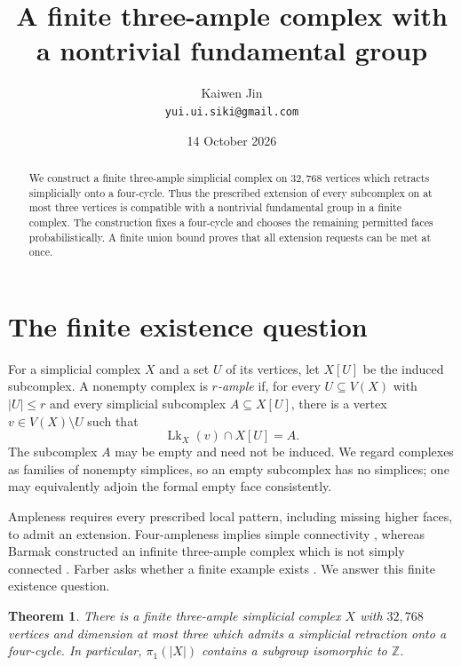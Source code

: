 \documentclass[11pt,a4paper]{article}
\title{A finite three-ample complex with a nontrivial fundamental group}
\author{Kaiwen Jin\\\small\texttt{yui.ui.siki@gmail.com}}
\date{14 October 2026}
\newtheorem{theorem}{Theorem}
\newcommand{\Lk}{\operatorname{Lk}}
\begin{document}
\maketitle

\begin{abstract}
We construct a finite three-ample simplicial complex on $32{,}768$ vertices
which retracts simplicially onto a four-cycle. Thus the prescribed extension
of every subcomplex on at most three vertices is compatible with a
nontrivial fundamental group in a finite complex. The construction fixes a
four-cycle and chooses the remaining permitted faces probabilistically. A
finite union bound proves that all extension requests can be met at once.
\end{abstract}

\section{The finite existence question}

For a simplicial complex $X$ and a set $U$ of its vertices, let $X[U]$ be
the induced subcomplex. A nonempty complex is \emph{$r$-ample} if, for every
$U\subseteq V(X)$ with $|U|\leq r$ and every simplicial subcomplex
$A\subseteq X[U]$, there is a vertex $v\in V(X)\setminus U$ such that
\begin{equation}\label{eq:ample}
    \Lk_X(v)\cap X[U]=A.
\end{equation}
The subcomplex $A$ may be empty and need not be induced. We regard complexes
as families of nonempty simplices, so an empty subcomplex has no simplices;
one may equivalently adjoin the formal empty face consistently.

Ampleness requires every prescribed local pattern, including missing higher
faces, to admit an extension. Four-ampleness implies simple connectivity
\cite[Proposition~6.1]{Farber}, whereas Barmak constructed an infinite
three-ample complex which is not
simply connected \cite[Theorem~1]{Barmak}. Farber asks whether a finite
example exists \cite[Example~2.5]{Farber}. We answer this finite existence
question.

\begin{theorem}\label{thm:main}
There is a finite three-ample simplicial complex $X$ with $32{,}768$ vertices
and dimension at most three which admits a simplicial retraction onto a
four-cycle. In particular, $\pi_1(|X|)$ contains a subgroup isomorphic to
$\mathbb{Z}$.
\end{theorem}
\end{document}
